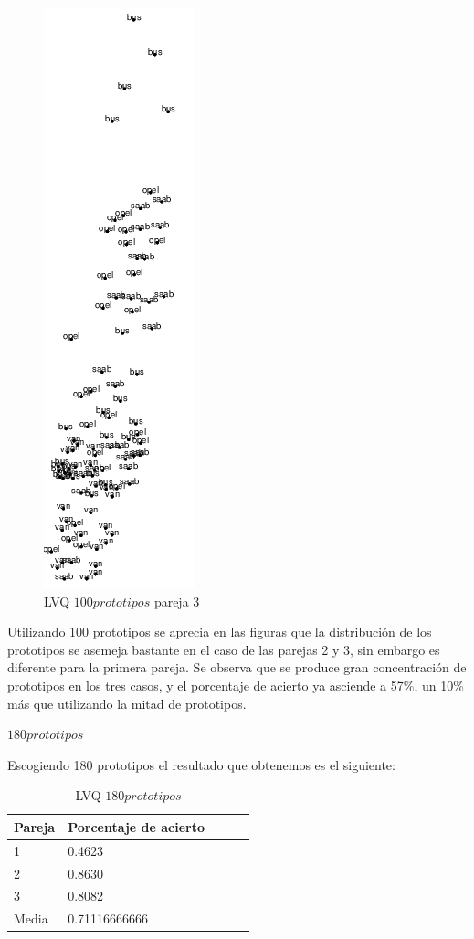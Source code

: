\documentclass[11pt,spanish,listoffigures,listoftables]{workluis}
\begin{document}
\begin{figure}[H]
\centering
\includegraphics[scale=0.5]{lvq100p3}
\caption{LVQ $100 prototipos$ pareja 3}
\end{figure} 

\par Utilizando 100 prototipos se aprecia en las figuras que la distribución de los prototipos se asemeja bastante en el caso de las parejas 2 y 3, sin embargo es diferente para la primera pareja. Se observa que se produce gran concentración de prototipos en los tres casos, y el porcentaje de acierto ya asciende a 57\%, un 10\% más que utilizando la mitad de prototipos.


\par \textbf{$180 prototipos$}

\par Escogiendo 180 prototipos el resultado que obtenemos es el siguiente:

\begin{table}[H]
\centering
\caption{LVQ $180 prototipos$}
\label{tb:tb24}
\begin{tabular}{lllll}
\hline
\multicolumn{1}{|l|}{Pareja} & Porcentaje de acierto \\ \hline \hline
1                            & 0.4623			     \\
2                            & 0.8630			     \\
3                            & 0.8082			     \\
Media                        & 0.71116666666         \\ \hline
\end{tabular}
\end{table}
\end{document}
